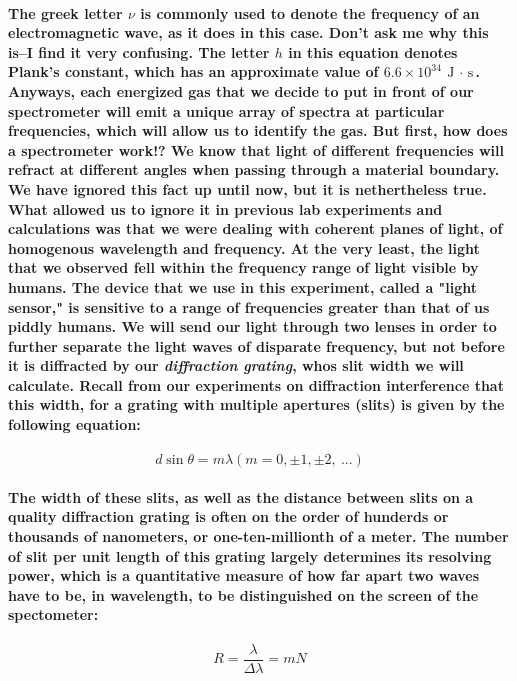 \documentclass[11.8pt]{amsart}
\begin{document}
\paragraph{The greek letter $\nu$ is commonly used to denote the frequency of an electromagnetic wave, as it does in this case. Don't ask me why this is--I find it very confusing. The letter $h$ in this equation denotes Plank's constant, which has an approximate value of $6.6 \times 10^{34} \ \text{J $\cdot$ s} $. Anyways, each energized gas that we decide to put in front of our spectrometer will emit a unique array of spectra at particular frequencies, which will allow us to identify the gas. But first, how does a spectrometer work!? We know that light of different frequencies will refract at different angles when passing through a material boundary. We have ignored this fact up until now, but it is nethertheless true. What allowed us to ignore it in previous lab experiments and calculations was that we were dealing with coherent planes of light, of homogenous wavelength and frequency. At the very least, the light that we observed fell within the frequency range of light visible by humans. The device that we use in this experiment, called a "light sensor," is sensitive to a range of frequencies greater than that of us piddly humans. We will send our light through two lenses in order to further separate the light waves of disparate frequency, but not before it is diffracted by our \textit{diffraction grating}, whos slit width we will calculate. Recall from our experiments on diffraction interference that this width, for a grating with multiple apertures (slits) is given by the following equation:}
\begin{equation}[H]
d\sin\theta = m\lambda (m = 0, \pm1, \pm2, \ ...)
\end{equation}
\paragraph{The width of these slits, as well as the distance between slits on a quality diffraction grating is often on the order of hunderds or thousands of nanometers, or one-ten-millionth of a meter. The number of slit per unit length of this grating largely determines its resolving power, which is a quantitative measure of how far apart two waves have to be, in wavelength, to be distinguished on the screen of the spectometer:}
\begin{equation}
R = \dfrac{\lambda}{\Delta\lambda} = mN
\end{equation}
\newpage
\end{document}
